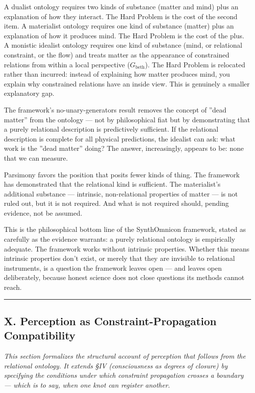 \documentclass[12pt,a4paper]{article}
\begin{document}
A dualist ontology requires two kinds of substance (matter and mind) plus an explanation of how they interact. The Hard Problem is the cost of the second item. A materialist ontology requires one kind of substance (matter) plus an explanation of how it produces mind. The Hard Problem is the cost of the plus. A monistic idealist ontology requires one kind of substance (mind, or relational constraint, or the flow) and treats matter as the appearance of constrained relations from within a local perspective ($G_\text{beth}$). The Hard Problem is relocated rather than incurred: instead of explaining how matter produces mind, you explain why constrained relations have an inside view. This is genuinely a smaller explanatory gap.

The framework's no-unary-generators result removes the concept of ''dead matter'' from the ontology --- not by philosophical fiat but by demonstrating that a purely relational description is predictively sufficient. If the relational description is complete for all physical predictions, the idealist can ask: what work is the ''dead matter'' doing? The answer, increasingly, appears to be: none that we can measure.

Parsimony favors the position that posits fewer kinds of thing. The framework has demonstrated that the relational kind is sufficient. The materialist's additional substance --- intrinsic, non-relational properties of matter --- is not ruled out, but it is not required. And what is not required should, pending evidence, not be assumed.

This is the philosophical bottom line of the SynthOmnicon framework, stated as carefully as the evidence warrants: a purely relational ontology is empirically adequate. The framework works without intrinsic properties. Whether this means intrinsic properties don't exist, or merely that they are invisible to relational instruments, is a question the framework leaves open --- and leaves open deliberately, because honest science does not close questions its methods cannot reach.

\begin{center}
\rule{0.5\textwidth}{0.4pt}
\end{center}

\subsection{X. Perception as Constraint-Propagation Compatibility}

\emph{This section formalizes the structural account of perception that follows from the relational ontology. It extends §IV (consciousness as degrees of closure) by specifying the conditions under which constraint propagation crosses a boundary --- which is to say, when one knot can register another.}
\end{document}
